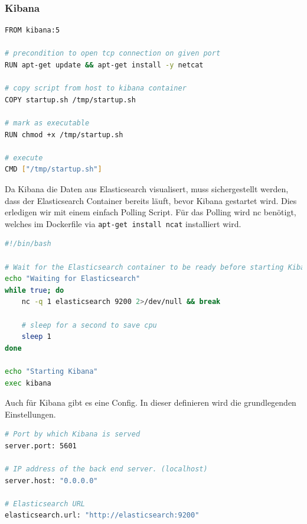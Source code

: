 \subsubsection{Kibana} 
\begin{lstlisting}[caption=Kibana Dockerfile, language=bash]
FROM kibana:5

# precondition to open tcp connection on given port
RUN apt-get update && apt-get install -y netcat

# copy script from host to kibana container
COPY startup.sh /tmp/startup.sh

# mark as executable
RUN chmod +x /tmp/startup.sh 

# execute
CMD ["/tmp/startup.sh"] 
\end{lstlisting}

Da Kibana die Daten aus Elasticsearch visualisert, muss sichergestellt werden, dass der Elasticsearch Container bereits läuft, bevor Kibana gestartet wird. Dies erledigen wir mit einem einfach Polling Script. Für das Polling wird nc benötigt, welches im Dockerfile via \lstinline[]|apt-get install ncat| installiert wird. 
\begin{lstlisting}[caption=Kibana Pooling Script, language=bash]
#!/bin/bash

# Wait for the Elasticsearch container to be ready before starting Kibana.
echo "Waiting for Elasticsearch"
while true; do
	nc -q 1 elasticsearch 9200 2>/dev/null && break
	
	# sleep for a second to save cpu
	sleep 1
done

echo "Starting Kibana"
exec kibana
\end{lstlisting}

Auch für Kibana gibt es eine Config. In dieser definieren wird die grundlegenden Einstellungen.	
\begin{lstlisting}[caption=kibana.yml, language=bash]
# Port by which Kibana is served
server.port: 5601

# IP address of the back end server. (localhost)
server.host: "0.0.0.0"

# Elasticsearch URL
elasticsearch.url: "http://elasticsearch:9200"
\end{lstlisting}


